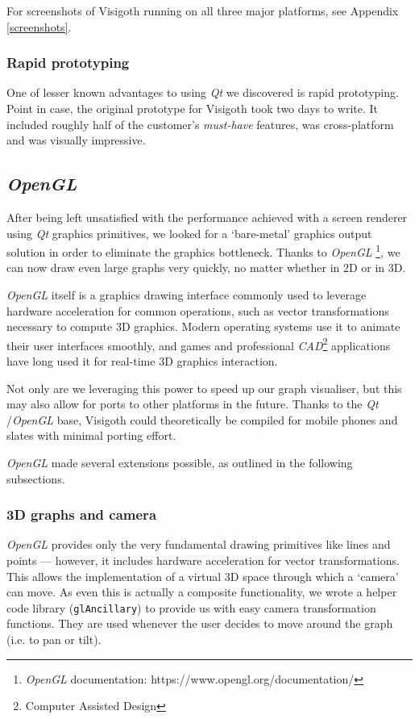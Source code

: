 \documentclass[a4paper,11pt,titlepage]{article}
\newcommand{\code}[1]{\texttt{#1}}
\newcommand{\buzz}[1]{\emph{#1}}
\newcommand{\Qt}{\buzz{Qt} }
\newcommand{\OpenGL}{\buzz{OpenGL} }
\begin{document}
For screenshots of Visigoth running on all three major platforms, see
Appendix \ref{screenshots}.

\subsubsection{Rapid prototyping}

One of lesser known advantages to using \Qt we discovered is rapid
prototyping. Point in case, the original prototype for Visigoth took
two days to write. It included roughly half of the customer's
\emph{must-have} features, was cross-platform and was visually
impressive.

\subsection{\OpenGL}
\label{opengl}

After being left unsatisfied with the performance achieved with a
screen renderer using \Qt graphics primitives, we looked for a
`bare-metal' graphics output solution in order to eliminate the
graphics bottleneck. Thanks to \OpenGL\footnote{\OpenGL
  documentation: https://www.opengl.org/documentation/}, we can now
draw even large graphs very quickly, no matter whether in 2D or in 3D.

\OpenGL itself is a graphics drawing interface commonly used to
leverage hardware acceleration for common operations, such as vector
transformations necessary to compute 3D graphics. Modern operating
systems use it to animate their user interfaces smoothly, and games
and professional \buzz{CAD}\footnote{Computer Assisted Design}
applications have long used it for real-time 3D graphics interaction.

Not only are we leveraging this power to speed up our graph
visualiser, but this may also allow for ports to other
platforms in the future. Thanks to the \Qt/\OpenGL base, Visigoth
could theoretically be compiled for mobile phones and slates
with minimal porting effort.

\OpenGL made several extensions possible, as outlined in the following
subsections.

\subsubsection{3D graphs and camera}
\OpenGL provides only the very fundamental drawing primitives like
lines and points --- however, it includes hardware acceleration for
vector transformations. This allows the implementation of a virtual 3D
space through which a `camera' can move. As even this is actually a
composite functionality, we wrote a helper code library
(\code{glAncillary}) to provide us with easy camera transformation
functions. They are used whenever the user decides to move around the
graph (i.e. to pan or tilt).
\end{document}
